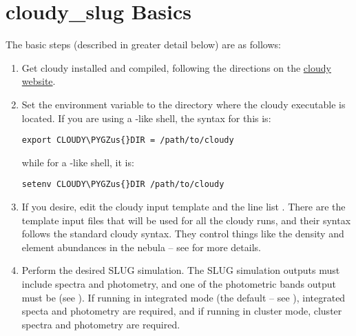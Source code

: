 \documentclass[letterpaper,10pt,english]{sphinxmanual}
\def\PYGZus{\char`\_}
\begin{document}
\section{cloudy\_slug Basics}
\label{cloudy:cloudy-slug-basics}
The basic steps (described in greater detail below) are as follows:
\begin{enumerate}
\item {} 
Get cloudy installed and compiled, following the directions on the
\href{http://nublado.org/}{cloudy website}.

\item {} 
Set the environment variable  to the directory where
the cloudy executable  is located.  If you are using
a -like shell, the syntax for this is:

\begin{Verbatim}[commandchars=\\\{\}]
export CLOUDY\PYGZus{}DIR = /path/to/cloudy
\end{Verbatim}

while for a -like shell, it is:

\begin{Verbatim}[commandchars=\\\{\}]
setenv CLOUDY\PYGZus{}DIR /path/to/cloudy
\end{Verbatim}

\item {} 
If you desire, edit the cloudy input template
 and the line list
. There are the template input files
that will be used for all the cloudy runs, and their syntax follows
the standard cloudy syntax. They control things like the density and
element abundances in the nebula -- see {\hyperref[cloudy:ssec-cloudy-template]{\emph{}}}
for more details.

\item {} 
Perform the desired SLUG simulation. The SLUG simulation outputs
must include spectra and photometry, and one of the photometric
bands output must be  (see {\hyperref[parameters:ssec-phot-keywords]{\emph{}}}). If
running in integrated mode (the default -- see
{\hyperref[cloudy:ssec-cloudy-cluster]{\emph{}}}), integrated specta and photometry are
required, and if running in cluster mode, cluster spectra and
photometry are required.


\end{enumerate}
\end{document}
